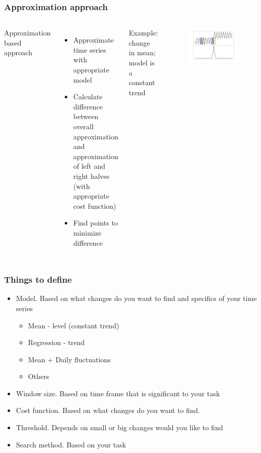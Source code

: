 \documentclass[intlimits, 9pt, unicode]{beamer}
\begin{document}
\begin{frame}
    \frametitle{Approximation approach}
  \begin{columns}[T,onlytextwidth]
	Approximation based approach
	    \begin{itemize}
	    	\item Approximate time series with appropriate model
		\item Calculate difference between overall approximation and approximation of left and right halves (with appropriate cost function)
		\item Find points to minimize difference
	    \end{itemize}
      Example: change in mean; model is a constant trend
      	\begin{figure}
		\includegraphics[scale=0.2]{images/approaches_second_4}
	\end{figure}
     \end{columns}
\end{frame}


\begin{frame}
    \frametitle{Things to define}
	 
	\begin{itemize}
	    	\item Model. Based on what changes do you want to find and specifics of your time series
			\begin{itemize}
			\item Mean - level (constant trend)
			\item Regression - trend
			\item Mean + Daily fluctuations
			\item Others
			\end{itemize}
		\item Window size. Based on time frame that is significant to your task
		\item Cost function. Based on what changes do you want to find.
		\item Threshold. Depends on small or big changes would you like to find
		\item Search method. Based on your task
	    \end{itemize}

 \end{frame}
\end{document}
